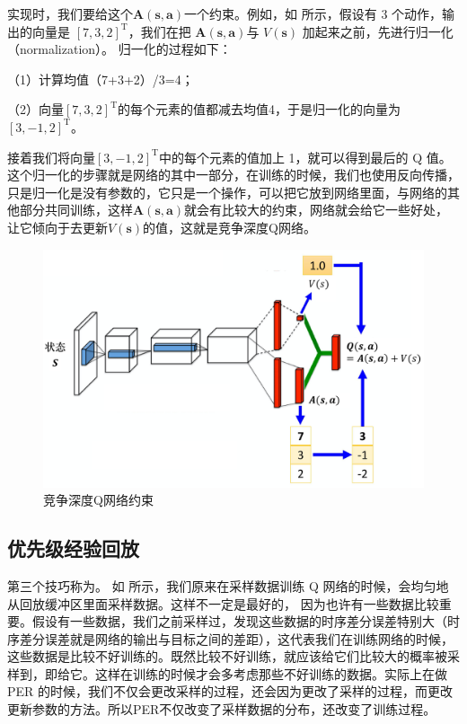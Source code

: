 实现时，我们要给这个$\boldsymbol{A}(\boldsymbol{s},\boldsymbol{a})$一个约束。例如，如 所示，假设有 3 个动作，输出的向量是 $[7,3,2]^{\mathrm{T}}$，我们在把 $\boldsymbol{A}(\boldsymbol{s},\boldsymbol{a})$与 $V(\boldsymbol{s})$ 加起来之前，先进行归一化（normalization）。
归一化的过程如下：

（1）计算均值（7+3+2）/3=4；

（2）向量$[7,3,2]^{\mathrm{T}}$的每个元素的值都减去均值4，于是归一化的向量为 $[3,-1,2]^{\mathrm{T}}$。

接着我们将向量$[3,-1,2]^{\mathrm{T}}$中的每个元素的值加上 1，就可以得到最后的 Q 值。这个归一化的步骤就是网络的其中一部分，在训练的时候，我们也使用反向传播，只是归一化是没有参数的，它只是一个操作，可以把它放到网络里面，与网络的其他部分共同训练，这样$\boldsymbol{A}(\boldsymbol{s},\boldsymbol{a})$就会有比较大的约束，网络就会给它一些好处，让它倾向于去更新$V(\boldsymbol{s})$的值，这就是竞争深度Q网络。
\begin{figure}[htb]
    \centering
    \includegraphics[width=0.5\linewidth]{res/ch7/7.6}
    \caption{竞争深度Q网络约束}
    \label{fig:dueling_dqn_3}
\end{figure}

\subsection{优先级经验回放} 

第三个技巧称为。
如 所示，我们原来在采样数据训练 Q 网络的时候，会均匀地从回放缓冲区里面采样数据。这样不一定是最好的， 因为也许有一些数据比较重要。假设有一些数据，我们之前采样过，发现这些数据的时序差分误差特别大（时序差分误差就是网络的输出与目标之间的差距），这代表我们在训练网络的时候，这些数据是比较不好训练的。既然比较不好训练，就应该给它们比较大的概率被采样到，即给它。这样在训练的时候才会多考虑那些不好训练的数据。实际上在做 PER 的时候，我们不仅会更改采样的过程，还会因为更改了采样的过程，而更改更新参数的方法。所以PER不仅改变了采样数据的分布，还改变了训练过程。

